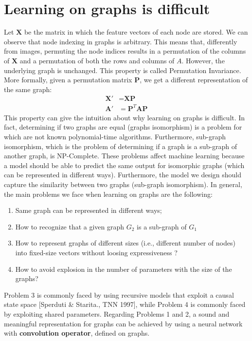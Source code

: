 \section{Learning on graphs is difficult}
Let $\textbf{X}$ be the matrix in which the feature vectors of each node are stored. We can observe that node indexing in graphs is arbitrary. This means that, differently from images, permuting the node indices results in a permutation of the columns of $\textbf{X}$ and a permutation of both the rows and columns of $A$. However, the underlying graph is unchanged. This property is called Permutation Invariance. More formally, given a permutation matrix $\textbf{P}$, we get a different representation of the same graph:
\[\begin{split}
    \textbf{X}' & = \textbf{XP}\\
    \textbf{A}' & = \textbf{P}^T \textbf{AP}
\end{split}
\]
This property can give the intuition about why learning on graphs is difficult. In fact, determining if two graphs are equal (graphs isomorphism) is a problem for which are not known polynomial-time algorithms. Furthermore, sub-graph isomorphism, which is the problem of determining if a graph is a sub-graph of another graph, is NP-Complete. These problems affect machine learning because a model should be able to predict the same output for isomorphic graphs (which can be represented in different ways). Furthermore, the model we design should capture the similarity between two graphs (sub-graph isomorphism).\newline\newline
In general, the main problems we face when learning on graphs are the following:
\begin{enumerate}
    \item Same graph can be represented in different ways;
    \item How to recognize that a given graph $G_2$ is a sub-graph of $G_1$
    \item How to represent graphs of different sizes (i.e., different number of nodes) into fixed-size vectors without loosing expressiveness ?

    \item How to avoid explosion in the number of parameters with the size of the graphs?
    
\end{enumerate}
Problem 3 is commonly faced by using recursive models that exploit a
causal state space [Sperduti \& Starita., TNN 1997], while Problem 4  is commonly faced by exploiting shared parameters.\newline\newline
Regarding Problems 1 and 2, a sound and meaningful representation for graphs can be achieved by using a neural network with \textbf{convolution operator}, defined on graphs.

